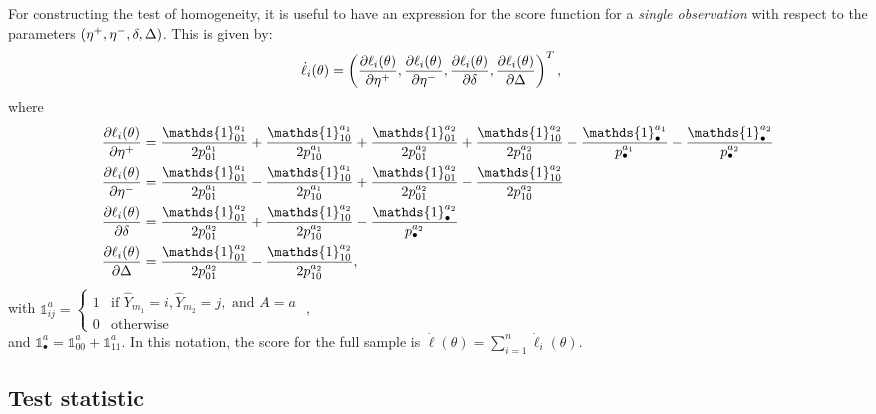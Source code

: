 \documentclass[11pt, sigconf, svgnames]{acmart}
\newcommand{\Ind}{\mathds{1}}
\begin{document}
 For constructing the test of homogeneity, it is useful to have an expression
 for the score function for a \emph{single observation} with respect to the parameters
$(\eta^+, \eta^-, \delta, \Delta)$.  This is given by:
\begin{align*}
  \dot\ell_i(\theta) &= \left(
   \frac{\partial\ell_i(\theta)}{\partial \eta^+},
   \frac{\partial\ell_i(\theta)}{\partial \eta^-},
   \frac{\partial\ell_i(\theta)}{\partial \delta},
   \frac{\partial \ell_i(\theta)}{\partial \Delta} 
   \right)^T ,
 \end{align*}
 where
 \begin{align*}
   \frac{\partial\ell_i(\theta)}{\partial \basepw} &=
   \frac{\Ind_{01}^{a_1}}{2p_{01}^{a_1}} + 
   \frac{\Ind_{10}^{a_1}}{2p_{10}^{a_1}} + 
   \frac{\Ind_{01}^{a_2}}{2p_{01}^{a_2}} + 
   \frac{\Ind_{10}^{a_2}}{2p_{10}^{a_2}} - 
   \frac{\Ind_\bullet^{a_1}}{p_\bullet^{a_1}}-
   \frac{\Ind_\bullet^{a_2}}{p_\bullet^{a_2}}\\
 \frac{\partial\ell_i(\theta)}{\partial \basemw} &=
   \frac{\Ind_{01}^{a_1}}{2p_{01}^{a_1}} - 
   \frac{\Ind_{10}^{a_1}}{2p_{10}^{a_1}} + 
   \frac{\Ind_{01}^{a_2}}{2p_{01}^{a_2}} - 
   \frac{\Ind_{10}^{a_2}}{2p_{10}^{a_2}} \\ 
   \frac{\partial\ell_i(\theta)}{\partial \diffpb} &=
   \frac{\Ind_{01}^{a_2}}{2p_{01}^{a_2}} + 
   \frac{\Ind_{10}^{a_2}}{2p_{10}^{a_2}} - 
   \frac{\Ind_\bullet^{a_2}}{p_\bullet^{a_2}}\\
   \frac{\partial \ell_i(\theta)}{\partial \Delta} &= 
   \frac{\Ind_{01}^{a_2}}{2p_{01}^{a_2}} -
   \frac{\Ind_{10}^{a_2}}{2p_{10}^{a_2}},
 \end{align*}
 with $\Ind_{ij}^a = \begin{cases} 1 & \text{if } \hat{Y}_{m_1}=i,
   \hat{Y}_{m_2}=j, \text{ and } A=a\\
 0 & \text{otherwise}\end{cases}$ , \\
 and $\Ind_{\bullet}^a =
 \Ind_{00}^a+\Ind_{11}^a$.
 In this notation, the score for the full sample is $\dot\ell(\theta) = \sum_{i=1}^n
 \dot\ell_i(\theta)$.

\newpage
\subsection*{Test statistic}
\end{document}
